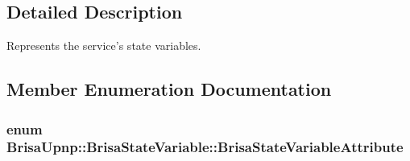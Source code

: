 \subsection{Detailed Description}
Represents the service's state variables. 

\subsection{Member Enumeration Documentation}
\hypertarget{classBrisaUpnp_1_1BrisaStateVariable_af6afe40d25c8990351bc7205dada3249}{
\subsubsection[{BrisaStateVariableAttribute}]{\setlength{\rightskip}{0pt plus 5cm}enum {\bf BrisaUpnp::BrisaStateVariable::BrisaStateVariableAttribute}}}
\label{classBrisaUpnp_1_1BrisaStateVariable_af6afe40d25c8990351bc7205dada3249}

